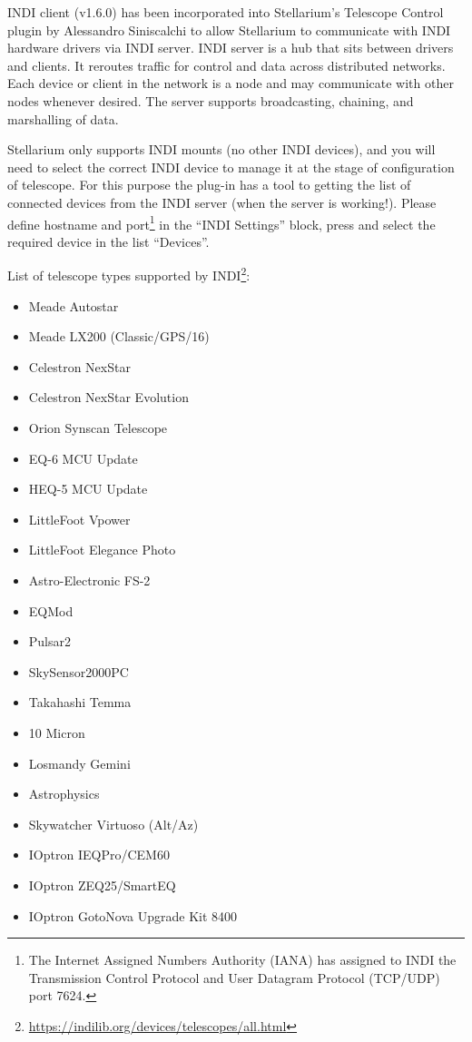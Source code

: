 INDI client (v1.6.0) has been incorporated into Stellarium's Telescope Control plugin 
by Alessandro Siniscalchi to allow Stellarium to communicate with INDI hardware drivers via INDI server. 
INDI server is a hub that sits between drivers and clients. It reroutes traffic for control and data across distributed networks. 
Each device or client in the network is a node and may communicate with other nodes whenever desired. 
The server supports broadcasting, chaining, and marshalling of data.

Stellarium only supports INDI mounts (no other INDI devices), and you will need to select the correct INDI device 
to manage it at the stage of configuration of telescope. 
For this purpose the plug-in has a tool to getting the list of connected devices from the INDI server (when the server is working!). 
Please define hostname and port\footnote{The Internet Assigned Numbers Authority (IANA) has assigned to INDI 
the Transmission Control Protocol and User Datagram Protocol (TCP/UDP) port 7624.} 
in the ``INDI Settings'' block, press  and select the required device in the list ``Devices''. 

List of telescope types supported by INDI\footnote{\url{https://indilib.org/devices/telescopes/all.html}}:
\begin{itemize}
\item Meade Autostar
\item Meade LX200 (Classic/GPS/16)
\item Celestron NexStar
\item Celestron NexStar Evolution
\item Orion Synscan Telescope
\item EQ-6 MCU Update
\item HEQ-5 MCU Update
\item LittleFoot Vpower
\item LittleFoot Elegance Photo
\item Astro-Electronic FS-2
\item EQMod
\item Pulsar2
\item SkySensor2000PC
\item Takahashi Temma
\item 10 Micron
\item Losmandy Gemini
\item Astrophysics
\item Skywatcher Virtuoso (Alt/Az)
\item IOptron IEQPro/CEM60
\item IOptron ZEQ25/SmartEQ
\item IOptron GotoNova Upgrade Kit 8400
\end{itemize}

